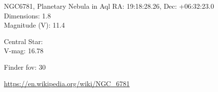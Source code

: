 \begin{block}{NGC6781, Planetary Nebula in Aql}
    RA: 19:18:28.26, Dec: +06:32:23.0 \\ 
    Dimensions: 1.8 \\ 
    Magnitude (V): 11.4

    Central Star: \\ 
      \hspace{1em}V-mag: 16.78 


    Finder fov: 30 

    \url{https://en.wikipedia.org/wiki/NGC_6781} 
\end{block}